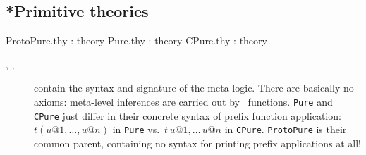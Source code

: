 \subsection{*Primitive theories}
\begin{ttbox}
ProtoPure.thy  : theory
Pure.thy       : theory
CPure.thy      : theory
\end{ttbox}
\begin{description}
\item[, ,
  ] contain the syntax and signature of the
  meta-logic.  There are basically no axioms: meta-level inferences
  are carried out by \ML\ functions.  \texttt{Pure} and \texttt{CPure}
  just differ in their concrete syntax of prefix function application:
  $t(u@1, \ldots, u@n)$ in \texttt{Pure} vs.\ $t\,u@1,\ldots\,u@n$ in
  \texttt{CPure}.  \texttt{ProtoPure} is their common parent,
  containing no syntax for printing prefix applications at all!

\end{description}



